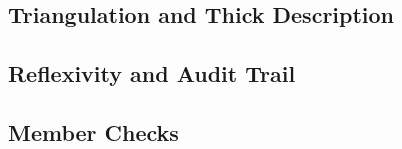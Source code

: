 \subsection{Triangulation and Thick Description}
\subsection{Reflexivity and Audit Trail}
\subsection{Member Checks}